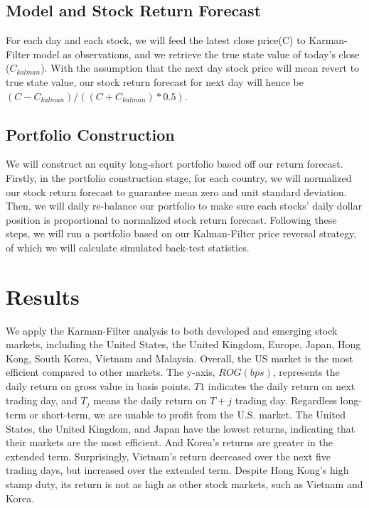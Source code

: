 \subsection{Model and Stock Return Forecast}
For each day and each stock, we will feed the latest close price(C) to Karman-Filter model as observations, and we retrieve the true state value of today’s close ($C_{kalman}$). With the assumption that the next day stock price will mean revert to true state value, our stock return forecast for next day will hence be $(C- C_{kalman} )/((C+C_{kalman})*0.5)$.

\subsection{Portfolio Construction}

We will construct an equity long-short portfolio based off our return forecast. Firstly, in the portfolio construction stage, for each country, we will normalized our stock return forecast to guarantee mean zero and unit standard deviation. Then, we will daily re-balance our portfolio to make sure each stocks’ daily dollar position is proportional to normalized stock return forecast. Following these steps, we will run a portfolio based on our Kalman-Filter price reversal strategy, of which we will calculate simulated back-test statistics. 


\section{Results}

We apply the Karman-Filter analysis to both developed and emerging stock markets, including the United States, the United Kingdom, Europe, Japan, Hong Kong, South Korea, Vietnam and Malaysia. Overall, the US market is the most efficient compared to other markets. The y-axis, $ROG(bps)$, represents the daily return on gross value in basis points. $T1$ indicates the daily return on next trading day, and $T_{j}$ means the daily return on $T+j$ trading day. Regardless long-term or short-term, we are unable to profit from the U.S. market. The United States, the United Kingdom, and Japan have the lowest returns, indicating that their markets are the most efficient. And Korea's returns are greater in the extended term. Surprisingly, Vietnam's return decreased over the next five trading days, but increased over the extended term. Despite Hong Kong's high stamp duty, its return is not as high as other stock markets, such as Vietnam and Korea.

